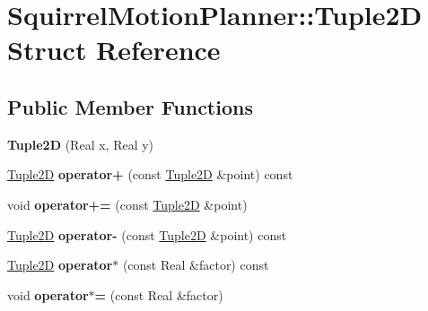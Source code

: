 \hypertarget{structSquirrelMotionPlanner_1_1Tuple2D}{\section{Squirrel\-Motion\-Planner\-:\-:Tuple2\-D Struct Reference}
\label{structSquirrelMotionPlanner_1_1Tuple2D}
}
\subsection*{Public Member Functions}
\begin{DoxyCompactItemize}
\item 
\hypertarget{structSquirrelMotionPlanner_1_1Tuple2D_ad0f33e7f27695f591a4b0f8c40e3a222}{{\bfseries Tuple2\-D} (Real x, Real y)}\label{structSquirrelMotionPlanner_1_1Tuple2D_ad0f33e7f27695f591a4b0f8c40e3a222}

\item 
\hypertarget{structSquirrelMotionPlanner_1_1Tuple2D_a1395d1697b64197145c8012526ded2d2}{\hyperlink{structSquirrelMotionPlanner_1_1Tuple2D}{Tuple2\-D} {\bfseries operator+} (const \hyperlink{structSquirrelMotionPlanner_1_1Tuple2D}{Tuple2\-D} \&point) const }\label{structSquirrelMotionPlanner_1_1Tuple2D_a1395d1697b64197145c8012526ded2d2}

\item 
\hypertarget{structSquirrelMotionPlanner_1_1Tuple2D_a91144c307b7e145e71f60bc03e2874e0}{void {\bfseries operator+=} (const \hyperlink{structSquirrelMotionPlanner_1_1Tuple2D}{Tuple2\-D} \&point)}\label{structSquirrelMotionPlanner_1_1Tuple2D_a91144c307b7e145e71f60bc03e2874e0}

\item 
\hypertarget{structSquirrelMotionPlanner_1_1Tuple2D_ad975a3b6d559938a3aa7fa870d18acfa}{\hyperlink{structSquirrelMotionPlanner_1_1Tuple2D}{Tuple2\-D} {\bfseries operator-\/} (const \hyperlink{structSquirrelMotionPlanner_1_1Tuple2D}{Tuple2\-D} \&point) const }\label{structSquirrelMotionPlanner_1_1Tuple2D_ad975a3b6d559938a3aa7fa870d18acfa}

\item 
\hypertarget{structSquirrelMotionPlanner_1_1Tuple2D_aae1dbcec0864bd3b5eb6bb36b47da8b3}{\hyperlink{structSquirrelMotionPlanner_1_1Tuple2D}{Tuple2\-D} {\bfseries operator$\ast$} (const Real \&factor) const }\label{structSquirrelMotionPlanner_1_1Tuple2D_aae1dbcec0864bd3b5eb6bb36b47da8b3}

\item 
\hypertarget{structSquirrelMotionPlanner_1_1Tuple2D_a2b58575c38492af842466ec4aa478ed2}{void {\bfseries operator$\ast$=} (const Real \&factor)}\label{structSquirrelMotionPlanner_1_1Tuple2D_a2b58575c38492af842466ec4aa478ed2}


\end{DoxyCompactItemize}
